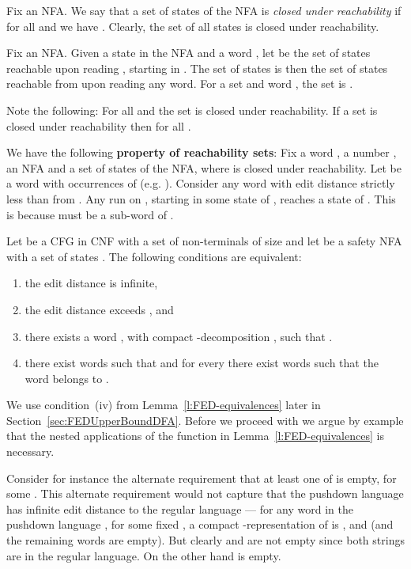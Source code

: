 \documentclass{CSML}
\begin{document}
\smallskip{}
Fix an NFA.
We say that a set  of states of the NFA is \emph{closed under reachability} if for all  and  we have . Clearly, the set of all states is closed under reachability.

\smallskip{}
Fix an NFA.
Given a state  in the NFA and a word , let  be the set of states reachable upon reading , starting in . The set of states  is then the set of states reachable from  upon reading any word. For a set  and word , the set  is . 


Note the following: For all  and  the set  is closed under reachability.
If a set  is closed under reachability then  for all . 

We have the following {\bf property of reachability sets}:  Fix a word , a number , an NFA and a set of states  of the NFA, where  is closed under reachability. Let  be a word with  occurrences of  (e.g. ).
Consider any word  with edit distance strictly less than  from . Any run on , starting in some state of , reaches a state of . This is because  must be a sub-word of . 




\begin{lem}
Let  be a CFG in CNF with a set of non-terminals of size  and let  be a safety NFA with a set of states .
The following conditions are equivalent:
\begin{enumerate}[label=(\roman*)]
\item the edit distance  is infinite,
\item the edit distance  exceeds , and
\item there exists a word , with compact -decomposition
, such that
.
\item there exist words  such that 
 and
for every  
there exist words  such that 
the word  belongs to .
\end{enumerate}
\label{l:FED-equivalences}
\end{lem}

\noindent We use condition~(iv) from Lemma~\ref{l:FED-equivalences} later in Section~\ref{sec:FEDUpperBoundDFA}.
Before we proceed with we argue by example that the nested applications of the  function in Lemma~\ref{l:FED-equivalences}  is necessary.

\smallskip{}
Consider for instance the alternate requirement that at least one of  is empty, for some . 
This alternate requirement would not capture that 
the pushdown language  has infinite edit distance to 
the regular language  --- for any word in the pushdown language , for some fixed , a compact -representation of  is ,  and  (and the remaining words are empty). 
But clearly  and  are not empty since both strings are in the regular language. On the other hand  is empty.
\end{document}
